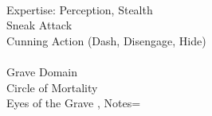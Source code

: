 \documentclass[10pt,a4paper]{scrbook}
\begin{document}
{{%
			\\
			Expertise: Perception, Stealth\\
			Sneak Attack\\
			Cunning Action (Dash, Disengage, Hide)\\
			\\
			Grave Domain\\
			Circle of Mortality\\
			Eyes of the Grave
		},
		Notes={
			
		}
	}
\end{document}
